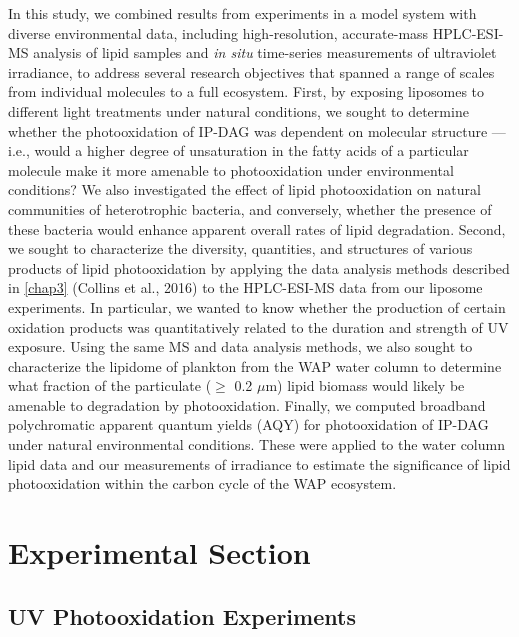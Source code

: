 In this study, we combined results from experiments in a model system with diverse environmental data, including high-resolution, accurate-mass HPLC-ESI-MS analysis of lipid samples and \emph{in situ} time-series measurements of ultraviolet irradiance, to address several research objectives that spanned a range of scales from individual molecules to a full ecosystem. First, by exposing liposomes to different light treatments under natural conditions, we sought to determine whether the photooxidation of IP-DAG was dependent on molecular structure --- i.e., would a higher degree of unsaturation in the fatty acids of a particular molecule make it more amenable to photooxidation under environmental conditions? We also investigated the effect of lipid photooxidation on natural communities of heterotrophic bacteria, and conversely, whether the presence of these bacteria would enhance apparent overall rates of lipid degradation. Second, we sought to characterize the diversity, quantities, and structures of various products of lipid photooxidation by applying the data analysis methods described in \autoref{chap3} (Collins et al., 2016) to the HPLC-ESI-MS data from our liposome experiments. In particular, we wanted to know whether the production of certain oxidation products was quantitatively related to the duration and strength of UV exposure. Using the same MS and data analysis methods, we also sought to characterize the lipidome of plankton from the WAP water column to determine what fraction of the particulate ($\geq$ 0.2 $\mu$m) lipid biomass would likely be amenable to degradation by photooxidation. Finally, we computed broadband polychromatic apparent quantum yields (AQY) for photooxidation of IP-DAG under natural environmental conditions. These were applied to the water column lipid data and our measurements of irradiance to estimate the significance of lipid photooxidation within the carbon cycle of the WAP ecosystem.

\section{Experimental Section}
\subsection{UV Photooxidation Experiments}
\label{ssec:UV Photooxidation Experiments}

